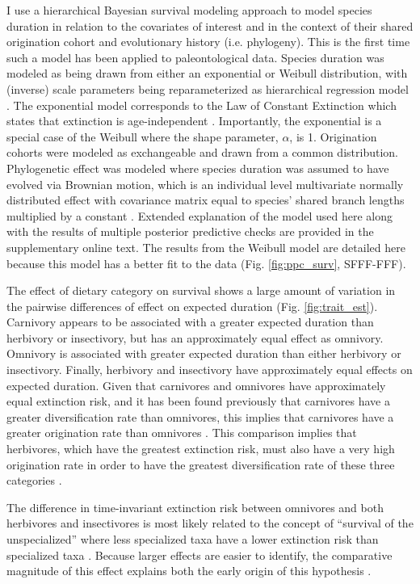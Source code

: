 \documentclass[12pt]{article}
\begin{document}
I use a hierarchical Bayesian survival modeling approach to model species duration in relation to the covariates of interest and in the context of their shared origination cohort and evolutionary history (i.e. phylogeny). This is the first time such a model has been applied to paleontological data. Species duration was modeled as being drawn from either an exponential or Weibull distribution, with (inverse) scale parameters being reparameterized as hierarchical regression model \cite{Gelman2013d}. The exponential model corresponds to the Law of Constant Extinction which states that extinction is age-independent \cite{VanValen1973}. Importantly, the exponential is a special case of the Weibull where the shape parameter, $\alpha$, is 1. Origination cohorts were modeled as exchangeable and drawn from a common distribution. Phylogenetic effect was modeled where species duration was assumed to have evolved via Brownian motion, which is an individual level multivariate normally distributed effect with covariance matrix equal to species' shared branch lengths multiplied by a constant \cite{Lynch1991}. Extended explanation of the model used here along with the results of multiple posterior predictive checks are provided in the supplementary online text. The results from the Weibull model are detailed here because this model has a better fit to the data (Fig. \ref{fig:ppc_surv}, SFFF-FFF).

The effect of dietary category on survival shows a large amount of variation in the pairwise differences of effect on expected duration (Fig. \ref{fig:trait_est}). Carnivory appears to be associated with a greater expected duration than herbivory or insectivory, but has an approximately equal effect as omnivory. Omnivory is associated with greater expected duration than either herbivory or insectivory. Finally, herbivory and insectivory have approximately equal effects on expected duration. 
Given that carnivores and omnivores have approximately equal extinction risk, and it has been found previously that carnivores have a greater diversification rate than omnivores, this implies that carnivores have a greater origination rate than omnivores \cite{Price2012}. This comparison implies that herbivores, which have the greatest extinction risk, must also have a very high origination rate in order to have the greatest diversification rate of these three categories \cite{Price2012}. 

The difference in time-invariant extinction risk between omnivores and both herbivores and insectivores is most likely related to the concept of ``survival of the unspecialized'' where less specialized taxa have a lower extinction risk than specialized taxa \cite{Liow2004a,Simpson1944}. Because larger effects are easier to identify, the comparative magnitude of this effect explains both the early origin of this hypothesis \cite{Simpson1944}. 
\end{document}
